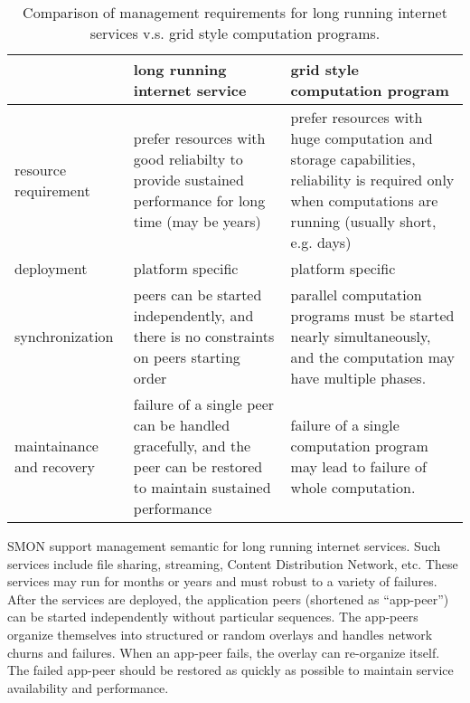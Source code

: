 \begin{table*}
\small
\centering
\begin{tabular}{|l|p{5cm}|p{5cm}|}

\hline

 & long running internet service & grid style computation
 program \\

\hline

resource requirement & prefer resources with good
reliabilty to provide sustained performance for long time
(may be years) & prefer
 resources with huge computation and storage capabilities,
 reliability is required only when computations are running
 (usually short, e.g. days) \\

\hline

deployment & platform specific & platform specific \\

\hline

synchronization & peers can be started independently, and there
is no constraints on peers starting order &
parallel computation programs must be started nearly
simultaneously, and the computation may have multiple
phases.\\

\hline

maintainance and recovery & failure of a single peer can be
handled gracefully, and the peer can be restored to maintain
sustained performance &
failure of a single computation program may lead to failure
of whole computation.\\

\hline

\end{tabular}
\caption{Comparison of management requirements for long
running internet services v.s. grid style computation
programs.}
\label{fig:app-man-req}
\end{table*}


SMON support management semantic for long running internet
services. Such services include file
sharing, streaming,
Content Distribution Network, etc. These
services may run for months or years and must robust to a
variety of failures. After the services are deployed, the
application peers (shortened as ``app-peer'') can be started
independently without particular sequences. The app-peers
organize themselves into structured or random overlays and
handles network churns and failures. When an app-peer fails,
the overlay can re-organize itself. The failed app-peer
should be restored as quickly as possible to maintain
service availability and performance.


